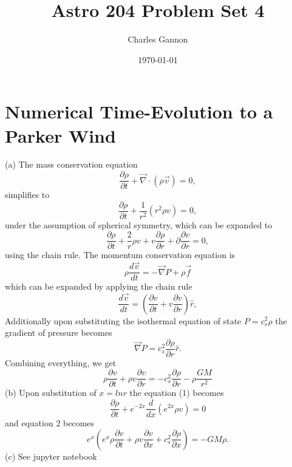 \documentclass[11pt]{article}
\author{Charles Gannon}
\date{\today}
\title{Astro 204 Problem Set 4}
\begin{document}
\maketitle
\tableofcontents

\section{Numerical Time-Evolution to a Parker Wind}
\label{sec:orgea8080f}
(a) The mass conservation equation
\begin{equation}
 \frac{\partial \rho}{\partial t} + \vec{\nabla} \cdot (\rho \vec{v}) = 0,
\end{equation}
simplifies to
\begin{equation}
 \frac{\partial \rho}{\partial t} + \frac{1}{r^2}\left(  r^2 \rho v \right )  = 0,
\end{equation}
under the assumption of spherical symmetry, which can be expanded to
\begin{equation}
 \frac{\partial \rho}{\partial t} + \frac{2}{r} \rho v + v \frac{\partial \rho}{\partial r} + \partial \frac{\partial v}{\partial r}  = 0,
\end{equation}
using the chain rule.
The momentum conservation equation is
\begin{equation}
 \rho \frac{d \vec{v}}{dt} = - \vec{\nabla} P + \rho \vec{f}
\end{equation}
which can be expanded by applying the chain rule
\begin{equation}
 \frac{d \vec{v}}{d t} = \left( \frac{\partial v}{\partial t} + v \frac{\partial  v}{\partial r} \right ) \hat{r} ,
\end{equation}
Additionally upon substituting the isothermal equation of state \(P = c_s^2 \rho\) the gradient of pressure becomes
\begin{equation}
 \vec{\nabla} P = c_s^2 \frac{\partial \rho}{\partial r} \hat{r}.
\end{equation}
Combining everything, we get
\begin{equation}
 \rho \frac{\partial v}{\partial t} + \rho v \frac{\partial v}{\partial r} = -c_s^2 \frac{\partial \rho}{\partial r} - \rho \frac{G M}{r^2}
\end{equation}
(b) Upon substitution of \(x = ln r\) the equation (1) becomes
\begin{equation}
 \frac{\partial \rho}{\partial t} + e^{-2x} \frac{d }{dx}(e^{2x}\rho v) = 0
\end{equation}
and equation 2 becomes
\begin{equation}
 e^{x} \left ( e^{x} \rho \frac{\partial v}{\partial t} + \rho v \frac{\partial v}{\partial x} + c_s^2 \frac{\partial \rho}{\partial x} \right ) =  - GM \rho.
\end{equation}
(c) See jupyter notebook
\end{document}
